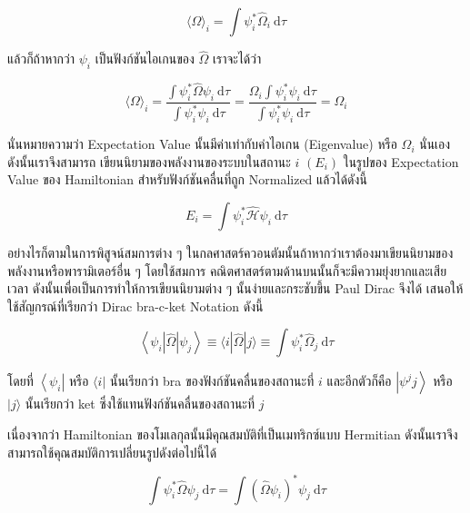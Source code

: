 \begin{equation}
    \langle\Omega\rangle_i = \int \psi_i^* \hat{\Omega}_i \mathrm{~d} \tau
\end{equation}

แล้วก็ถ้าหากว่า $\psi_i$ เป็นฟังก์ชันไอเกนของ $\hat{\Omega}$ เราจะได้ว่า

\begin{equation}
    \langle\Omega\rangle_i 
    = \frac{\int \psi_i^* \hat{\Omega} \psi_i \mathrm{~d} \tau}{\int \psi_i^* \psi_i \mathrm{~d} \tau} 
    = \frac{\Omega_i \int \psi_i^* \psi_i \mathrm{~d} \tau}{\int \psi_i^* \psi_i \mathrm{~d} \tau} 
    = \Omega_i
\end{equation}

\noindent นั่นหมายความว่า Expectation Value นั้นมีค่าเท่ากับค่าไอเกน (Eigenvalue) หรือ $\Omega_i$ นั่นเอง ดังนั้นเราจึงสามารถ%
เขียนนิยามของพลังงานของระบบในสถานะ $i$ $(E_i)$ ในรูปของ Expectation Value ของ Hamiltonian สำหรับฟังก์ชันคลื่นที่ถูก 
Normalized แล้วได้ดังนี้ 

\begin{equation}
    E_i = \int \psi_i^* \hat{\mathcal{H}} \psi_i \mathrm{~d} \tau
\end{equation}

อย่างไรก็ตามในการพิสูจน์สมการต่าง ๆ ในกลศาสตร์ควอนตัมนั้นถ้าหากว่าเราต้องมาเขียนนิยามของพลังงานหรือพารามิเตอร์อื่น ๆ โดยใช้สมการ%
คณิตศาสตร์ตามด้านบนนั้นก็จะมีความยุ่งยากและเสียเวลา ดังนั้นเพื่อเป็นการทำให้การเขียนนิยามต่าง ๆ นั้นง่ายและกระชับขึ้น Paul Dirac จึงได้%
เสนอให้ใช้สัญกรณ์ที่เรียกว่า Dirac bra-c-ket Notation ดังนี้

\begin{equation}
    \left\langle\psi_i|\hat{\Omega}| \psi_j\right\rangle 
    \equiv 
    \langle i|\hat{\Omega}| j\rangle 
    \equiv 
    \int \psi_i^* \hat{\Omega}_j \mathrm{~d} \tau
\end{equation}

\noindent โดยที่ $\left\langle\psi_i\right|$ หรือ $\langle i|$ นั้นเรียกว่า bra ของฟังก์ชันคลื่นของสถานะที่ $i$ และอีกตัวก็คือ 
$\left|\psi^j j\right\rangle$ หรือ $|j\rangle$ นั้นเรียกว่า ket ซึ่งใช้แทนฟังก์ชันคลื่นของสถานะที่ $j$

เนื่องจากว่า Hamiltonian ของโมเลกุลนั้นมีคุณสมบัติที่เป็นเมทริกซ์แบบ Hermitian ดังนั้นเราจึงสามารถใช้คุณสมบัติการเปลี่ยนรูปดังต่อไปนี้ได้

\begin{equation}
    \int \psi_i^* \hat{\Omega} \psi_j \mathrm{~d} \tau 
    = \int\left(\hat{\Omega} \psi_i\right)^* \psi_j \mathrm{~d} \tau
\end{equation}

